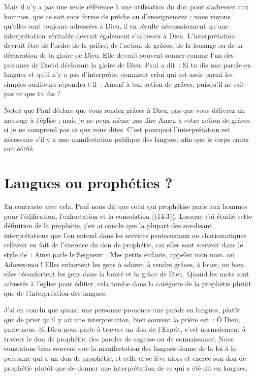 Mais il n'y a pas une seule référence à une utilisation du don
 pour s'adresser aux hommes, que ce soit sous forme de prêche
 ou d'enseignement ; nous voyons qu'elles sont toujours adressées à Dieu,
 il en résulte nécessairement qu'une interprétation véritable devrait
 également s'adresser à Dieu. L'interprétation devrait être de l'ordre
 de la prière, de l'action de grâces, de la louange ou de la déclaration
 de la gloire de Dieu. Elle devrait souvent sonner comme l'un des psaumes
 de David déclarant la gloire de Dieu. Paul a dit~:
 \og Si tu dis une parole en langues et qu'il n'y a pas d'interprète,
 comment celui qui est assis parmi les simples auditeurs
 répondra-t-il~: Amen! à ton action de grâces, puisqu'il ne sait pas
 ce que tu dis ? \fg{}

Notez que Paul déclare que vous rendez grâces à Dieu, pas que vous délivrez
 un message à l'église ; mais je ne peux même pas dire \og Amen \fg{}
 à votre action de grâces si je ne comprend pas ce que vous dites.
 C'est pourquoi l'interprétation est nécessaire s'il y a une manifestation
 publique des langues, afin que le corps entier soit édifié.


\section{Langues ou proph\'eties ?}

En contraste avec cela, Paul nous dit que celui qui prophétise
 parle aux hommes pour l'édification, l'exhortation et la consolation
 ((14:3)). Lorsque j'ai étudié cette définition
 de la prophétie, j'en ai conclu que la plupart des soi-disant
 interprétations que l'on entend dans les services pentecostaux
 ou charismatiques relèvent en fait de l'exercice du don de prophétie,
 car elles sont souvent dans le style de~: \og Ainsi parle le Seigneur~:
 \og Mes petits enfants, appelez mon nom. \fg{} ou \og Adorez-moi ! \fg{}
 Elles exhortent les gens à adorer, à rendre grâces, à louer,
 ou bien elles réconfortent les gens dans la bonté et la grâce de Dieu.
 Quand les mots sont adressés à l'église pour édifier, cela tombe
 dans la catégorie de la prophétie plutôt que de l'interpréation des langues.

J'ai en conclu que quand une personne prononce une parole en langues,
 plutôt que de prier qu'il y ait une interprétation, bien souvent
 la prière est~: \og Ô Dieu, parle-nous. \fg{}
 Si Dieu nous parle à travers un don de l'Esprit, c'est normalement
 à travers le don de prophétie, des paroles de sagesse ou de connaissance.
 Nous constatons bien souvent que la manifestation des langues donne de la foi
 à la personne qui a un don de prophétie, et celle-ci se lève alors et exerce son don
 de prophétie plutôt que de donner une interprétation de ce qui a été dit
 en langues.

